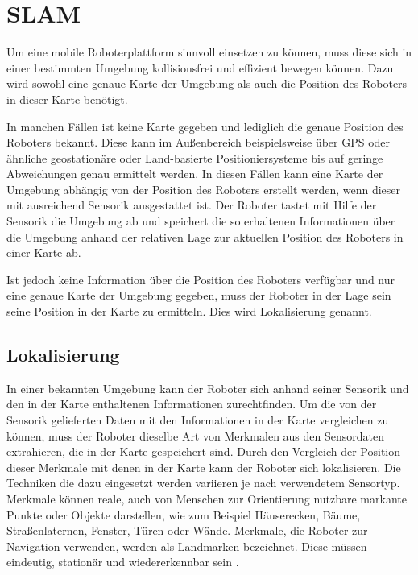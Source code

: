 \chapter[SLAM (Kopp)]{SLAM}
%

Um eine mobile Roboterplattform sinnvoll einsetzen zu können, muss diese sich in einer bestimmten Umgebung kollisionsfrei und effizient bewegen können. Dazu wird sowohl eine genaue Karte der Umgebung als auch die Position des Roboters in dieser Karte benötigt. 

In manchen Fällen ist keine Karte gegeben und lediglich die genaue Position des Roboters bekannt. Diese kann im Außenbereich beispielsweise über GPS oder ähnliche geostationäre oder Land-basierte Positioniersysteme bis auf geringe Ab\-wei\-chung\-en genau ermittelt werden. In diesen Fällen kann eine Karte der Umgebung abhängig von der Position des Roboters erstellt werden, wenn dieser mit ausreichend  Sensorik ausgestattet ist. Der Roboter tastet mit Hilfe der Sensorik die Umgebung ab und spei\-chert die so erhaltenen Informationen über die Umgebung anhand der relativen Lage zur aktuellen Position des Roboters in einer Karte ab. 

Ist jedoch keine Information über die Position des Roboters verfügbar und nur eine genaue Karte der Umgebung gegeben, muss der Roboter in der Lage sein seine Position in der Karte zu ermitteln. Dies wird Lokalisierung genannt. 

\section[Lokalisierung (Kopp)]{Lokalisierung}
\label{sec:Lokalisierung}

In einer bekannten Umgebung kann der Roboter sich anhand seiner Sensorik und den in der Karte enthaltenen Informationen zurechtfinden. Um die von der Sensorik gelieferten Daten mit den Informationen in der Karte vergleichen zu können, muss der Roboter dieselbe Art von Merkmalen aus den Sensordaten extrahieren, die in der Karte ge\-spei\-chert sind. Durch den Vergleich der Position dieser Merkmale mit denen in der Karte kann der Roboter sich lokalisieren. Die Techniken die dazu eingesetzt werden variieren je nach verwendetem Sensortyp. Merkmale können reale, auch von Menschen zur Orientierung nutzbare markante Punkte oder Objekte darstellen, wie zum Beispiel Häuserecken, Bäume, Straßenlaternen, Fenster, Türen oder Wände. Merkmale, die Roboter zur Navigation verwenden, werden als Landmarken bezeichnet. Diese müssen eindeutig, stationär und wiedererkennbar sein \cite{thrun2005}.

